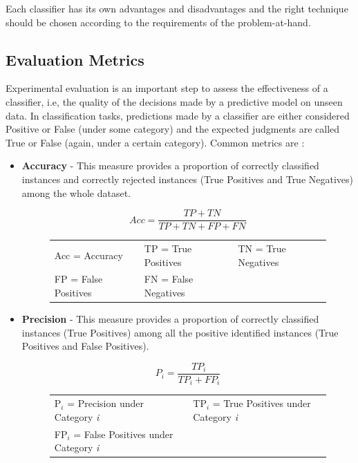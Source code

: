 Each classifier has its own advantages and disadvantages and the right technique should be chosen according to the requirements of the problem-at-hand.
\subsection{Evaluation Metrics}

Experimental evaluation is an important step to assess the effectiveness of a classifier, i.e, the quality of the decisions made by a predictive model on unseen data. In classification tasks, predictions made by a classifier are either considered Positive or False (under some category) and the expected judgments are called True or False (again, under a certain category). Common metrics are \citep{Sebastiani2002MLTC}:

\begin{itemize}
		\item \textbf{Accuracy} - This measure provides a proportion of correctly classified  instances and correctly rejected instances (True Positives and True Negatives) among the whole dataset.
	\begin{figure}[H]
      \centering
    	\[ Acc = \frac{TP + TN}{TP + TN + FP + FN} \]
		\begin{tabular}{lll}
        Acc = Accuracy & TP = True Positives & TN = True Negatives \\ 
        FP = False Positives & FN = False Negatives &
      \end{tabular}
      \end{figure}
      
	\item \textbf{Precision} - This measure provides a proportion of correctly classified  instances (True Positives) among all the positive identified instances (True Positives and False Positives).
	\begin{figure}[H]
      \centering
    	\[ P_i = \frac{TP_i}{TP_i+FP_i} \]
		\begin{tabular}{ll}
        P$_i$ = Precision under Category \textit{i} & TP$_i$ = True Positives under Category \textit{i} \\
        FP$_i$ = False Positives under Category \textit{i} & 
      \end{tabular}
      \end{figure}


\end{itemize}
